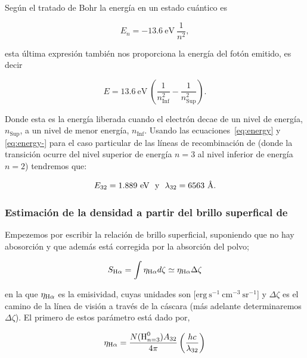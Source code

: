 Según el tratado de Bohr la energía en un estado cuántico es

\begin{equation}
  \label{eq:quantum}
  E_{n} = -13.6~\text{eV}~\frac{1}{n^{2}},
\end{equation}

esta última expresión también nos proporciona la energía del fotón emitido, es decir

\begin{equation}
  \label{eq:energy-}
 E = 13.6~\text{eV}~\left(\frac{1}{n_{\text{Inf}}^{2}}-\frac{1}{n_{\text{Sup}}^{2}}\right).
\end{equation}

 Donde esta es la energía liberada cuando el electrón decae de un nivel de energía, \(n_{\text{Sup}}\), a un nivel de menor energía, \(n_{\text{Inf}}\). Usando las ecuaciones~\ref{eq:energy} y \ref{eq:energy-} para el caso particular de las líneas de recombinación de \ha{} (donde la transición ocurre del nivel superior de energía \(n=3\) al nivel inferior de energía \(n=2\)) tendremos que: 

\begin{equation}
 \label{eq:values-energy-landa}
  E_{32} = 1.889~\text{eV}  ~~ \text{y} ~~
  \lambda_{32} = 6563~\text{\AA{}}{}.
 \end{equation}

\subsubsection{Estimación de la densidad a partir del brillo superfical de \ha{} }
\label{sec:brillo}

Empezemos por escribir la relación de brillo superficial, suponiendo que no hay abosorción y que además está corregida por la absorción del polvo;

\begin{equation}
  \label{eq:brillo}
  S_{\mathrm{H}\alpha{}} = \int \eta_{\mathrm{H}\alpha{}} d\zeta \simeq \eta_{\mathrm{H}\alpha{}} \Delta \zeta
\end{equation}  

\noindent en la que  \(\eta_{\mathrm{H}\alpha{}}\) es la emisividad, cuyas unidades son [\(\mathrm{erg~s^{-1}~cm^{-3}~sr^{-1}}\)] y \(\Delta \zeta\) es el camino de la línea de visión a través de la cáscara (más adelante determinaremos \(\Delta \zeta\)). El primero de estos parámetro está dado por,

  \begin{equation}
    \label{eq:emision-coeficiente}
    \eta_{\mathrm{H}\alpha} = \frac{N(\text{H}^0_{n=3})A_{32}}{4 \pi} \left(\frac{hc}{\lambda_{32}}\right) 
  \end{equation}


